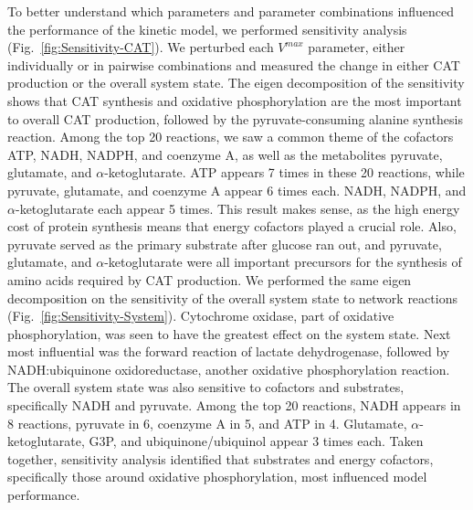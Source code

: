 \documentclass[12pt]{article}
\begin{document}
To better understand which parameters and parameter combinations influenced the performance of the kinetic model, we performed sensitivity analysis (Fig.~\ref{fig:Sensitivity-CAT}).
We perturbed each $V^{max}$ parameter, either individually or in pairwise combinations and measured the change in either CAT production or the overall system state.
The eigen decomposition of the sensitivity shows that CAT synthesis and oxidative phosphorylation are the most important to overall CAT production, followed by the pyruvate-consuming alanine synthesis reaction.
Among the top 20 reactions, we saw a common theme of the cofactors ATP, NADH, NADPH, and coenzyme A, as well as the metabolites pyruvate, glutamate, and $\alpha$-ketoglutarate.
ATP appears 7 times in these 20 reactions, while pyruvate, glutamate, and coenzyme A appear 6 times each.
NADH, NADPH, and $\alpha$-ketoglutarate each appear 5 times.
This result makes sense, as the high energy cost of protein synthesis means that energy cofactors played a crucial role.
Also, pyruvate served as the primary substrate after glucose ran out, and pyruvate, glutamate, and $\alpha$-ketoglutarate were all important precursors for the synthesis of amino acids required by CAT production.
We performed the same eigen decomposition on the sensitivity of the overall system state to network reactions (Fig.~\ref{fig:Sensitivity-System}).
Cytochrome oxidase, part of oxidative phosphorylation, was seen to have the greatest effect on the system state.
Next most influential was the forward reaction of lactate dehydrogenase, followed by NADH:ubiquinone oxidoreductase, another oxidative phosphorylation reaction.
The overall system state was also sensitive to cofactors and substrates, specifically NADH and pyruvate.
Among the top 20 reactions, NADH appears in 8 reactions, pyruvate in 6, coenzyme A in 5, and ATP in 4.
Glutamate, $\alpha$-ketoglutarate, G3P, and ubiquinone/ubiquinol appear 3 times each.
Taken together, sensitivity analysis identified that substrates and energy cofactors, specifically those around oxidative phosphorylation, most influenced model performance.
\end{document}
